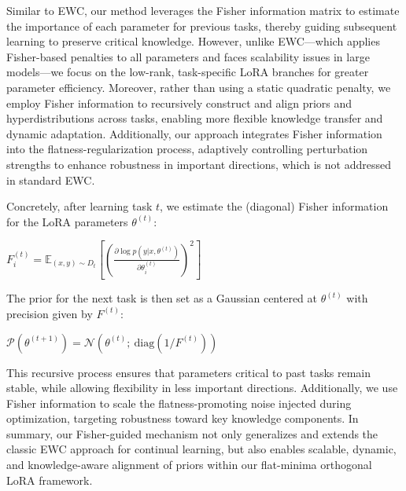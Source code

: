 \documentclass[letterpaper]{article} %
\begin{document}
Similar to EWC, our method leverages the Fisher information matrix to estimate the importance of each parameter for previous tasks, thereby guiding subsequent learning to preserve critical knowledge. However, unlike EWC—which applies Fisher-based penalties to all parameters and faces scalability issues in large models—we focus on the low-rank, task-specific LoRA branches for greater parameter efficiency. Moreover, rather than using a static quadratic penalty, we employ Fisher information to recursively construct and align priors and hyperdistributions across tasks, enabling more flexible knowledge transfer and dynamic adaptation. Additionally, our approach integrates Fisher information into the flatness-regularization process, adaptively controlling perturbation strengths to enhance robustness in important directions, which is not addressed in standard EWC.

Concretely, after learning task $t$, we estimate the (diagonal) Fisher information for the LoRA parameters $\theta^{(t)}$:

$F^{(t)}_i = \mathbb{E}_{(x, y) \sim D_t} \left[ \left( \frac{\partial \log p(y|x, \theta^{(t)})}{\partial \theta^{(t)}_i} \right)^2 \right]$

The prior for the next task is then set as a Gaussian centered at $\theta^{(t)}$ with precision given by $F^{(t)}$:

$\mathcal{P}(\theta^{(t+1)}) = \mathcal{N}(\theta^{(t)};\ \text{diag}(1/F^{(t)}))$

This recursive process ensures that parameters critical to past tasks remain stable, while allowing flexibility in less important directions. Additionally, we use Fisher information to scale the flatness-promoting noise injected during optimization, targeting robustness toward key knowledge components. In summary, our Fisher-guided mechanism not only generalizes and extends the classic EWC approach for continual learning, but also enables scalable, dynamic, and knowledge-aware alignment of priors within our flat-minima orthogonal LoRA framework.
















\end{document}

